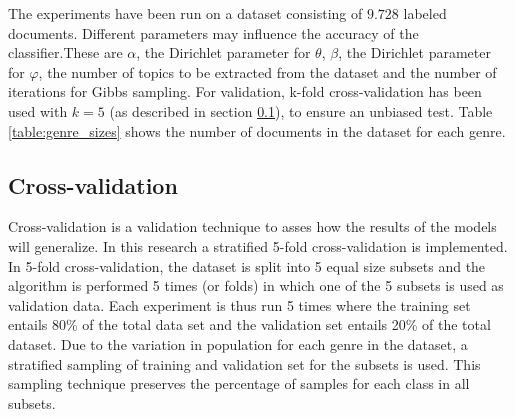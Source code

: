 
The experiments have been run on a dataset consisting of $9.728$ labeled documents. Different parameters may influence the accuracy of the classifier.These are $\alpha$, the Dirichlet parameter for $\theta$, $\beta$, the Dirichlet parameter for $\varphi$, the number of topics to be extracted from the dataset and the number of iterations for Gibbs sampling. 
For validation, k-fold cross-validation has been used with $k=5$ (as described in section \ref{sec:fold}), to ensure an unbiased test. Table \ref{table:genre_sizes} shows the number of documents in the dataset for each genre.

\begin{table}[htp!]
\begin{center}
\caption{Number of documents per genre}
\label{table:genre_sizes}
\end{center}
\end{table}


\subsection{Cross-validation}\label{sec:fold}
Cross-validation is a validation technique to asses how the results of the models will generalize. In this research a stratified 5-fold cross-validation is implemented. In 5-fold cross-validation, the dataset is split into 5 equal size subsets and the algorithm is performed 5 times (or folds) in which one of the 5 subsets is used as validation data. Each experiment is thus run 5 times where the training set entails 80\% of the total data set and the validation set entails 20\% of the total dataset. Due to the variation in population for each genre in the dataset, a stratified sampling of training and validation set for the subsets is used. This sampling technique preserves the percentage of samples for each class in all subsets.


